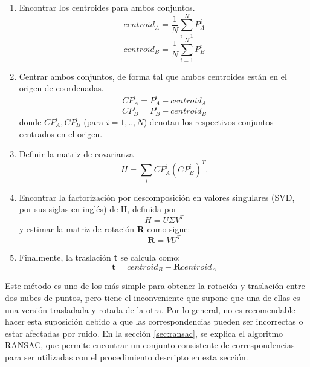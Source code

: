 \begin{enumerate}

\item Encontrar los centroides para ambos conjuntos.
\begin{equation}
centroid_{A} = \frac{1}{N} \sum_{i = 1}^{N} P_{A}^{i}
\end{equation}
\begin{equation}
centroid_{B} = \frac{1}{N} \sum_{i = 1}^{N} P_{B}^{i}
\end{equation}

\item Centrar ambos conjuntos, de forma tal que ambos centroides están en el origen de coordenadas.
\begin{equation}
CP_{A}^{i} = P_{A}^{i} - centroid_{A}
\end{equation}
\begin{equation}
CP_{B}^{i} = P_{B}^{i} - centroid_{B}
\end{equation}
donde $CP_{A}^{i}, CP_{B}^{i}$ (para $i=1,..,N$) denotan los respectivos conjuntos centrados en el origen.

\item Definir la matriz de covarianza
\begin{equation}
H = \sum_{i} CP_{A}^{i} (CP_{B}^{i})^{T}.
\end{equation}

\item Encontrar la factorización por descomposición en valores singulares (SVD, por sus siglas en inglés)\cite{wiki-svd} de H, definida por
\begin{equation}
H = U \Sigma V^{T}
\end{equation}
y estimar la matriz de rotación \textbf{R} como sigue:
\begin{equation}
\textbf{R} = V U^{T}
\end{equation}

\item Finalmente, la traslación \textbf{t} se calcula como:
\begin{equation}
\textbf{t} = centroid_{B} - \textbf{R} centroid_{A}
\end{equation}

\end{enumerate}

Este método es uno de los más simple para obtener la rotación y traslación entre dos nubes de puntos, pero tiene el inconveniente que supone que una de ellas es una versión trasladada y rotada de la otra. Por lo general, no es recomendable hacer esta suposición debido a que las correspondencias pueden ser incorrectas o estar afectadas por ruido. En la sección \ref{sec:ransac}, se explica el algoritmo RANSAC, que permite encontrar un conjunto consistente de correspondencias para ser utilizadas con el procedimiento descripto en esta sección.

